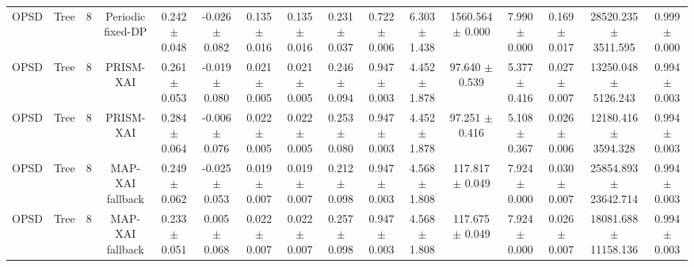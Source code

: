 \begin{tabular}{lccccccccccccccc}
OPSD & Tree & 8 & Periodic fixed-DP & 0.242 $\pm$ 0.048 & -0.026 $\pm$ 0.082 & 0.135 $\pm$ 0.016 & 0.135 $\pm$ 0.016 & 0.231 $\pm$ 0.037 & 0.722 $\pm$ 0.006 & 6.303 $\pm$ 1.438 & 1560.564 $\pm$ 0.000 & 7.990 $\pm$ 0.000 & 0.169 $\pm$ 0.017 & 28520.235 $\pm$ 3511.595 & 0.999 $\pm$ 0.000 \\
OPSD & Tree & 8 & PRISM-XAI & 0.261 $\pm$ 0.053 & -0.019 $\pm$ 0.080 & 0.021 $\pm$ 0.005 & 0.021 $\pm$ 0.005 & 0.246 $\pm$ 0.094 & 0.947 $\pm$ 0.003 & 4.452 $\pm$ 1.878 & 97.640 $\pm$ 0.539 & 5.377 $\pm$ 0.416 & 0.027 $\pm$ 0.007 & 13250.048 $\pm$ 5126.243 & 0.994 $\pm$ 0.003 \\
OPSD & Tree & 8 & PRISM-XAI & 0.284 $\pm$ 0.064 & -0.006 $\pm$ 0.076 & 0.022 $\pm$ 0.005 & 0.022 $\pm$ 0.005 & 0.253 $\pm$ 0.080 & 0.947 $\pm$ 0.003 & 4.452 $\pm$ 1.878 & 97.251 $\pm$ 0.416 & 5.108 $\pm$ 0.367 & 0.026 $\pm$ 0.006 & 12180.416 $\pm$ 3594.328 & 0.994 $\pm$ 0.003 \\
OPSD & Tree & 8 & MAP-XAI fallback & 0.249 $\pm$ 0.062 & -0.025 $\pm$ 0.053 & 0.019 $\pm$ 0.007 & 0.019 $\pm$ 0.007 & 0.212 $\pm$ 0.098 & 0.947 $\pm$ 0.003 & 4.568 $\pm$ 1.808 & 117.817 $\pm$ 0.049 & 7.924 $\pm$ 0.000 & 0.030 $\pm$ 0.007 & 25854.893 $\pm$ 23642.714 & 0.994 $\pm$ 0.003 \\
OPSD & Tree & 8 & MAP-XAI fallback & 0.233 $\pm$ 0.051 & 0.005 $\pm$ 0.068 & 0.022 $\pm$ 0.007 & 0.022 $\pm$ 0.007 & 0.257 $\pm$ 0.098 & 0.947 $\pm$ 0.003 & 4.568 $\pm$ 1.808 & 117.675 $\pm$ 0.049 & 7.924 $\pm$ 0.000 & 0.026 $\pm$ 0.007 & 18081.688 $\pm$ 11158.136 & 0.994 $\pm$ 0.003 \\
\bottomrule
\end{tabular}
